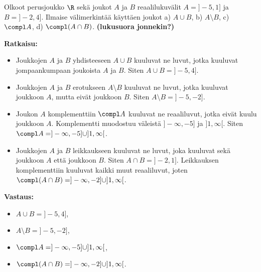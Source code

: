 \begin{esimerkki}
Olkoot perusjoukko $\R$ sekä joukot $A$ ja $B$ reaalilukuvälit $A = ]-5, 1]$ ja $B = ]-2, 4]$. Ilmaise välimerkintää käyttäen joukot a) $A\cup B$, b) $A \setminus B$, c) $\compl A$, d) $\compl( A \cap B)$. {\bf (lukusuora jonnekin?)}  

{\bf Ratkaisu:} 
\begin{itemize}
\item[a)] Joukkojen $A$ ja $B$ yhdisteeseen $A \cup B$ kuuluvat ne luvut, jotka kuuluvat jompaankumpaan joukoista $A$ ja $B$. Siten $A\cup B = ]-5, 4]$.
\item[b)] Joukkojen $A$ ja $B$ erotukseen $A \setminus B$ kuuluvat ne luvut, jotka kuuluvat joukkoon $A$, mutta eivät joukkoon $B$. Siten $A \setminus B = ]-5, -2]$.
\item[c)] Joukon $A$ komplementtiin $\compl A$ kuuluvat ne reaaliluvut, jotka eivät kuulu joukkoon $A$. Komplementti muodostuu väleistä $]-\infty, -5]$ ja $]1, \infty [$. Siten $\compl A = ]-\infty, -5] \cup ]1, \infty [$.
\item[d)] Joukkojen $A$ ja $B$ leikkaukseen kuuluvat ne luvut, joka kuuluvat sekä joukkoon $A$ että joukkoon $B$. Siten $A\cap B = ]-2, 1]$. Leikkauksen komplementtiin kuuluvat kaikki muut reaaliluvut, joten $\compl( A \cap B) = ]-\infty, -2] \cup ]1,\infty [$.
\end{itemize}

{\bf Vastaus:}
\begin{itemize}
\item[a)] $A\cup B =]-5, 4]$,
\item[b)] $A \setminus B = ]-5, -2]$,
\item[c)] $\compl A = ]-\infty, -5] \cup ]1, \infty [$,
\item[d)] $\compl( A \cap B) = ]-\infty, -2] \cup ]1,\infty [$.
\end{itemize}
\end{esimerkki}

